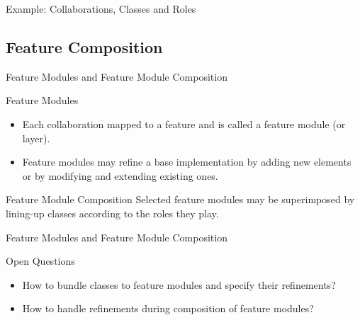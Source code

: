 \begin{frame}{Example: Collaborations, Classes and Roles}
	\begin{exampletight}{}
		\centering
	\end{exampletight}
\end{frame}

\subsection{Feature Composition}

\begin{frame}{Feature Modules and Feature Module Composition}
	\begin{mycolumns}[widths={65,35}]
		\begin{definition}{Feature Modules}
			\begin{itemize}
				\item Each collaboration mapped to a feature and is called a feature module (or layer).
				\item Feature modules may refine a base implementation by adding new elements or by modifying and extending existing ones.
			\end{itemize}
		\end{definition}
	\mynextcolumn
		\begin{definition}{Feature Module Composition}
			Selected feature modules may be superimposed by lining-up classes according to the roles they play.
		\end{definition}
	\end{mycolumns}
	\begin{exampletight}{}
		\centering
	\end{exampletight}
\end{frame}

\begin{frame}{Feature Modules and Feature Module Composition}
	\begin{note}{Open Questions}
		\begin{itemize}
			\item How to bundle classes to feature modules and specify their refinements?
			\item How to handle refinements during composition of feature modules?
		\end{itemize}
	\end{note}
	\begin{exampletight}{}
		\centering
	\end{exampletight}
\end{frame}

